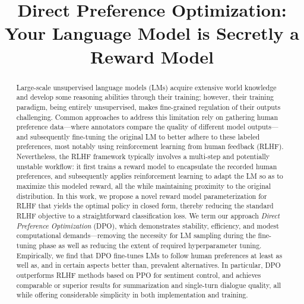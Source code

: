 \title{Direct Preference Optimization: Your Language Model is Secretly a Reward Model}

\begin{abstract}
Large-scale unsupervised language models (LMs) acquire extensive world knowledge and develop some reasoning abilities through their training; however, their training paradigm, being entirely unsupervised, makes fine-grained regulation of their outputs challenging. Common approaches to address this limitation rely on gathering human preference data—where annotators compare the quality of different model outputs—and subsequently fine-tuning the original LM to better adhere to these labeled preferences, most notably using reinforcement learning from human feedback (RLHF). Nevertheless, the RLHF framework typically involves a multi-step and potentially unstable workflow: it first trains a reward model to encapsulate the recorded human preferences, and subsequently applies reinforcement learning to adapt the LM so as to maximize this modeled reward, all the while maintaining proximity to the original distribution. In this work, we propose a novel reward model parameterization for RLHF that yields the optimal policy in closed form, thereby reducing the standard RLHF objective to a straightforward classification loss. We term our approach \textit{Direct Preference Optimization} (DPO), which demonstrates stability, efficiency, and modest computational demands—removing the necessity for LM sampling during the fine-tuning phase as well as reducing the extent of required hyperparameter tuning. Empirically, we find that DPO fine-tunes LMs to follow human preferences at least as well as, and in certain aspects better than, prevalent alternatives. In particular, DPO outperforms RLHF methods based on PPO for sentiment control, and achieves comparable or superior results for summarization and single-turn dialogue quality, all while offering considerable simplicity in both implementation and training.
\end{abstract}


